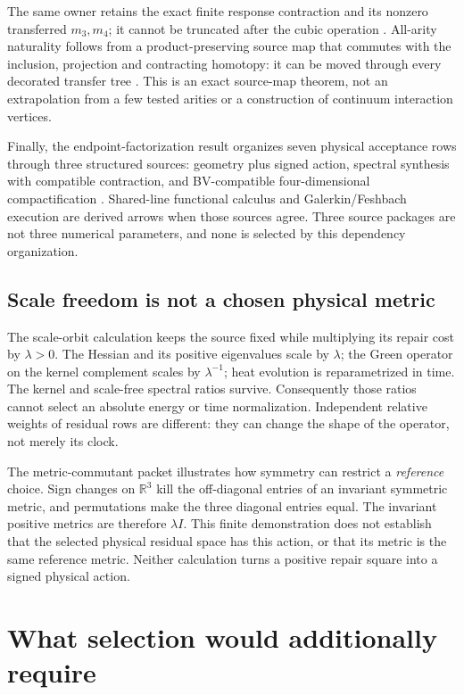 \documentclass[11pt]{article}
\theoremstyle{definition}
\theoremstyle{remark}
\begin{document}
The same owner retains the exact finite response contraction and its
nonzero transferred \(m_3,m_4\); it cannot be truncated after the cubic
operation \cite{ConsumerMThree,ConsumerMFour}. All-arity naturality follows
from a product-preserving source map that commutes with the inclusion,
projection and contracting homotopy: it can be moved through every
decorated transfer tree \cite{ConsumerAllArity}. This is an exact
source-map theorem, not an extrapolation from a few tested arities or a
construction of continuum interaction vertices.

Finally, the endpoint-factorization result organizes seven physical
acceptance rows through three structured sources: geometry plus signed
action, spectral synthesis with compatible contraction, and BV-compatible
four-dimensional compactification \cite{ConsumerEndpoint}. Shared-line
functional calculus and Galerkin/Feshbach execution are derived arrows
when those sources agree. Three source packages are not three numerical
parameters, and none is selected by this dependency organization.

\subsection{Scale freedom is not a chosen physical metric}
\label{sec:metric-scale}

The scale-orbit calculation \cite{FRG3B} keeps the source fixed while
multiplying its repair cost by \(\lambda>0\).  The Hessian and its positive
eigenvalues scale by \(\lambda\); the Green operator on the kernel complement
scales by \(\lambda^{-1}\); heat evolution is reparametrized in time.
The kernel and scale-free spectral ratios survive.  Consequently those
ratios cannot select an absolute energy or time normalization.  Independent
relative weights of residual rows are different: they can change the shape
of the operator, not merely its clock.

The metric-commutant packet \cite{FRG3C} illustrates how symmetry can restrict
a \emph{reference} choice.  Sign changes on \(\mathbb R^3\) kill the
off-diagonal entries of an invariant symmetric metric, and permutations make
the three diagonal entries equal.  The invariant positive metrics are
therefore \(\lambda I\).  This finite demonstration does not establish that
the selected physical residual space has this action, or that its metric is
the same reference metric.  Neither calculation turns a positive repair
square into a signed physical action.

\section{What selection would additionally require}
\label{sec:selection}
\end{document}
